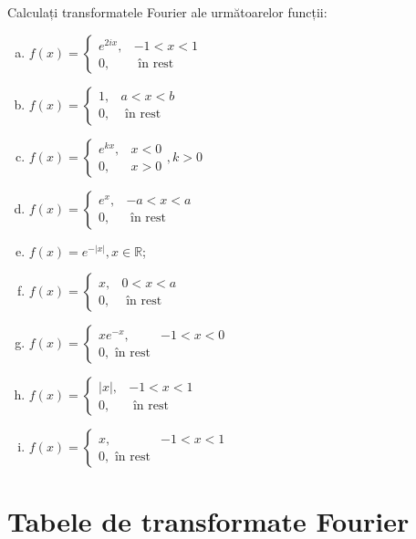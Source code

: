\documentclass[12pt,a4paper]{article}
\newcommand\RR{\mathbb{R}}
\theoremstyle{dotless}
\theoremstyle{dotlessdr}
\begin{document}
Calculați transformatele Fourier ale următoarelor funcții:
\begin{enumerate}[(a)]
\item $ f(x)
  = \begin{cases}
    e^{2ix}, & -1 < x < 1 \\
    0, & \text{ în rest }
  \end{cases}
  $
\item $ f(x) =
  \begin{cases}
    1, & a < x < b \\
    0, & \text{ în rest }
  \end{cases}
  $
\item $ f(x) =
  \begin{cases}
    e^{kx}, & x < 0 \\
    0, & x > 0
  \end{cases}, k > 0
  $
\item $ f(x) =
  \begin{cases}
    e^x, & -a < x < a \\
    0, & \text{ în rest}
  \end{cases}
  $
\item $ f(x) = e^{-|x|}, x \in \RR $;
\item $ f(x) =
  \begin{cases}
    x, & 0 < x < a \\
    0, & \text{ în rest}
  \end{cases}
  $
\item $ f(x) =
  \begin{cases}
    xe^{-x}, & -1 < x < 0 \\
    0, \text{ în rest}
  \end{cases}
  $
\item $ f(x) =
  \begin{cases}
    |x|, & -1 < x < 1 \\
    0, & \text{ în rest}
  \end{cases}
  $
\item $ f(x) =
  \begin{cases}
    x, & -1 < x < 1 \\
    0, \text{ în rest}
  \end{cases}
  $
\end{enumerate}

\newpage

\section*{Tabele de transformate Fourier}
\end{document}
